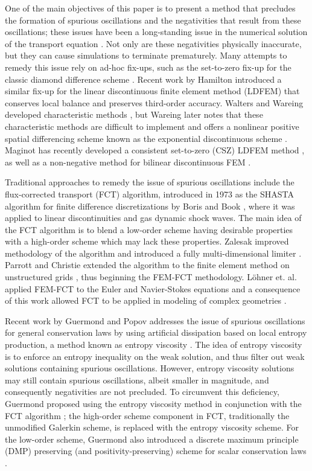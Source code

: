 One of the main objectives of this paper is to present a method that precludes
the formation of spurious oscillations and the negativities that result from
these oscillations; these issues have been a long-standing issue in the
numerical solution of the transport equation \cite{lanthrop}.
Not only are these negativities physically inaccurate, but they can cause
simulations to terminate prematurely. Many attempts to remedy this
issue rely on ad-hoc fix-ups, such as the set-to-zero fix-up for the
classic diamond difference scheme \cite{lewis}. Recent work by Hamilton
introduced a similar fix-up for the linear discontinuous finite element
method (LDFEM) that conserves local balance and preserves third-order accuracy.
Walters and Wareing developed characteristic methods \cite{walters_NC}, but
Wareing later notes that these characteristic methods are difficult to
implement and offers a nonlinear positive spatial differencing scheme
known as the exponential discontinuous scheme \cite{wareing}.
Maginot has recently developed a consistent set-to-zero (CSZ) LDFEM
method \cite{maginot}, as well as a non-negative method for bilinear
discontinuous FEM \cite{maginot_mc2015}.

Traditional approaches to remedy the issue of spurious oscillations include
the flux-corrected transport (FCT) algorithm, introduced in 1973 as
the SHASTA algorithm for finite difference discretizations
by Boris and Book \cite{borisbook}, where it was applied to linear discontinuities
and gas dynamic shock waves. The main idea of the FCT algorithm is to blend a
low-order scheme having desirable properties with a high-order scheme which may
lack these properties.
Zalesak improved methodology of the algorithm and introduced a fully
multi-dimensional limiter \cite{zalesak}.
Parrott and Christie extended the algorithm to the finite element method
on unstructured grids \cite{parrott}, thus beginning the FEM-FCT methodology.
L\"{o}hner et. al. applied FEM-FCT to the Euler and Navier-Stokes equations and
a consequence of this work allowed FCT to be applied in modeling of complex
geometries \cite{lohner}.

Recent work by Guermond and Popov addresses the issue of spurious oscillations
for general conservation laws by using artificial dissipation based on
local entropy production, a method known as entropy viscosity \cite{guermond_ev}.
The idea of entropy viscosity is to enforce an entropy inequality on the weak solution,
and thus filter out weak solutions containing spurious oscillations. However,
entropy viscosity solutions may still contain spurious
oscillations, albeit smaller in magnitude, and consequently negativities
are not precluded. To circumvent this deficiency, Guermond proposed using
the entropy viscosity method in conjunction with the FCT
algorithm \cite{guermond_secondorder}; the high-order scheme component in FCT,
traditionally the unmodified Galerkin scheme, is replaced with the entropy
viscosity scheme.
For the low-order
scheme, Guermond also introduced
a discrete maximum principle (DMP) preserving (and positivity-preserving)
scheme for scalar
conservation laws \cite{guermond_firstorder}.

